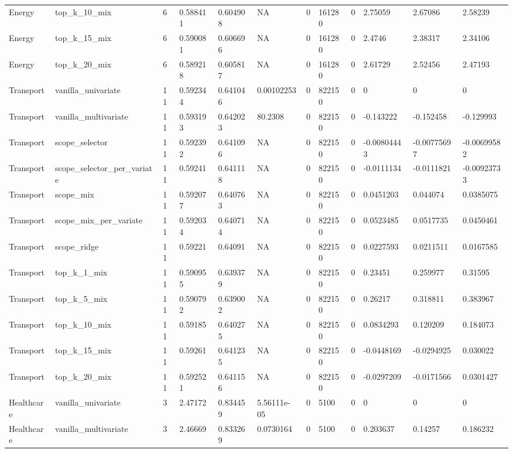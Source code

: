 \begin{tabular}{llllllllllll}
Energy & top\_k\_10\_mix & 6 & 0.588411 & 0.604908 & NA & 0 & 161280 & 0 & 2.75059 & 2.67086 & 2.58239 \\
Energy & top\_k\_15\_mix & 6 & 0.590081 & 0.606696 & NA & 0 & 161280 & 0 & 2.4746 & 2.38317 & 2.34106 \\
Energy & top\_k\_20\_mix & 6 & 0.589218 & 0.605817 & NA & 0 & 161280 & 0 & 2.61729 & 2.52456 & 2.47193 \\
Transport & vanilla\_univariate & 11 & 0.592344 & 0.641046 & 0.00102253 & 0 & 822150 & 0 & 0 & 0 & 0 \\
Transport & vanilla\_multivariate & 11 & 0.593193 & 0.642023 & 80.2308 & 0 & 822150 & 0 & -0.143222 & -0.152458 & -0.129993 \\
Transport & scope\_selector & 11 & 0.592392 & 0.641096 & NA & 0 & 822150 & 0 & -0.00804443 & -0.00775697 & -0.00699582 \\
Transport & scope\_selector\_per\_variate & 11 & 0.59241 & 0.641118 & NA & 0 & 822150 & 0 & -0.0111134 & -0.0111821 & -0.00923733 \\
Transport & scope\_mix & 11 & 0.592077 & 0.640763 & NA & 0 & 822150 & 0 & 0.0451203 & 0.044074 & 0.0385075 \\
Transport & scope\_mix\_per\_variate & 11 & 0.592034 & 0.640714 & NA & 0 & 822150 & 0 & 0.0523485 & 0.0517735 & 0.0450461 \\
Transport & scope\_ridge & 11 & 0.59221 & 0.64091 & NA & 0 & 822150 & 0 & 0.0227593 & 0.0211511 & 0.0167585 \\
Transport & top\_k\_1\_mix & 11 & 0.590955 & 0.639379 & NA & 0 & 822150 & 0 & 0.23451 & 0.259977 & 0.31595 \\
Transport & top\_k\_5\_mix & 11 & 0.590792 & 0.639002 & NA & 0 & 822150 & 0 & 0.26217 & 0.318811 & 0.383967 \\
Transport & top\_k\_10\_mix & 11 & 0.59185 & 0.640275 & NA & 0 & 822150 & 0 & 0.0834293 & 0.120209 & 0.184073 \\
Transport & top\_k\_15\_mix & 11 & 0.59261 & 0.641235 & NA & 0 & 822150 & 0 & -0.0448169 & -0.0294925 & 0.030022 \\
Transport & top\_k\_20\_mix & 11 & 0.592521 & 0.641156 & NA & 0 & 822150 & 0 & -0.0297209 & -0.0171566 & 0.0301427 \\
Healthcare & vanilla\_univariate & 3 & 2.47172 & 0.834459 & 5.56111e-05 & 0 & 5100 & 0 & 0 & 0 & 0 \\
Healthcare & vanilla\_multivariate & 3 & 2.46669 & 0.833269 & 0.0730164 & 0 & 5100 & 0 & 0.203637 & 0.14257 & 0.186232 \\

\end{tabular}

